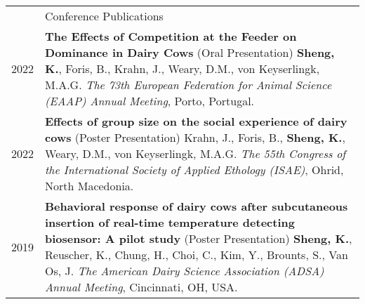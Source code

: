 \documentclass[letterpaper, 11pt]{article}
\newcommand{\headingfont}{\Large\color{OliveGreen}}
\newenvironment{SectionTable}[1]{
	\renewcommand*{\arraystretch}{1.7}
	\setlength{\tabcolsep}{10pt}
	\begin{longtable}{Rp{5.2in}} & #1 \\}
{\end{longtable}\vspace{-.3cm}}
\begin{document}
\begin{SectionTable}{\headingfont Conference Publications}
2022 & 
\textbf{The Effects of Competition at the Feeder on Dominance in Dairy Cows} (Oral Presentation) \newline
\textbf{Sheng, K.}, Foris, B., Krahn, J., Weary, D.M., von Keyserlingk, M.A.G. \newline
\textit{The 73th European Federation for Animal Science (EAAP) Annual Meeting}, Porto, Portugal. \\
2022 & 
\textbf{Effects of group size on the social experience of dairy cows} (Poster Presentation) \newline
Krahn, J., Foris, B., \textbf{Sheng, K.}, Weary, D.M., von Keyserlingk, M.A.G. \newline
\textit{The 55th Congress of the International Society of Applied Ethology (ISAE)}, Ohrid, North Macedonia. \\
2019 & 
\textbf{Behavioral response of dairy cows after subcutaneous insertion of real-time temperature detecting biosensor: A pilot study} (Poster Presentation)\newline
\textbf{Sheng, K.}, Reuscher, K., Chung, H., Choi, C., Kim, Y., Brounts, S., Van Os, J. \newline
\textit{The American Dairy Science Association (ADSA) Annual Meeting}, Cincinnati, OH, USA.
\end{SectionTable}
\end{document}
